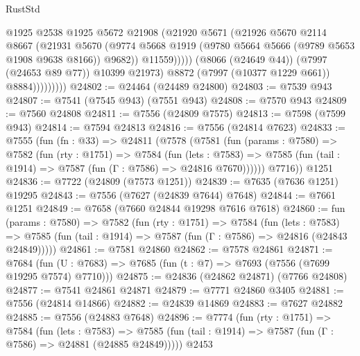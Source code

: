 \begin{lexlean}{RustStd}
\begin{coremodule}
                              @1925
                              @2538
                              @1925
                              @5672
                              @21908
                              (@21920
                                @5671
                                (@21926
                                  @5670
                                  @2114
                                  @8667
                                  (@21931
                                    @5670
                                    (@9774
                                      @5668
                                      @1919
                                      (@9780 @5664 @5666 (@9789 @5653 @1908 @9638 @8166))
                                      @9682))
                                  @11559)))))
                        (@8066 (@24649 @44))
                        (@7997 (@24653 @89 @77))
                        @10399
                        @21973)
                      @8872
                      (@7997 (@10377 @1229 @661))
                      @8884)))))))))
@24802 := @24464 (@24489 @24800)
@24803 := @7539 @943
@24807 := @7541 (@7545 @943) (@7551 @943)
@24808 := @7570 @943
@24809 := @7560 @24808
@24811 := @7556 (@24809 @7575)
@24813 := @7598 (@7599 @943)
@24814 := @7594 @24813
@24816 := @7556 (@24814 @7623)
@24833 := @7555
    (fun (fn : @33) =>
    @24811
      (@7578
        (@7581
          (fun (params : @7580) =>
          @7582
            (fun (rty : @1751) =>
            @7584
              (fun (lets : @7583) =>
              @7585 (fun (tail : @1914) => @7587 (fun (Γ : @7586) => @24816 @7670))))))
        @7716))
    @1251
@24836 := @7722 (@24809 (@7573 @1251))
@24839 := @7635 (@7636 @1251) @19295
@24843 := @7556 (@7627 (@24839 @7644) @7648)
@24844 := @7661 @1251
@24849 := @7658 (@7660 @24844 @19298 @7616 @7618)
@24860 := fun (params : @7580) =>
  @7582
    (fun (rty : @1751) =>
    @7584
      (fun (lets : @7583) =>
      @7585 (fun (tail : @1914) => @7587 (fun (Γ : @7586) => @24816 (@24843 @24849)))))
@24861 := @7581 @24860
@24862 := @7578 @24861
@24871 := @7684
    (fun (U : @7683) => @7685 (fun (t : @7) => @7693 (@7556 (@7699 @19295 @7574) @7710)))
@24875 := @24836 (@24862 @24871) (@7766 @24808)
@24877 := @7541 @24861 @24871
@24879 := @7771 @24860 @3405
@24881 := @7556 (@24814 @14866)
@24882 := @24839 @14869
@24883 := @7627 @24882
@24885 := @7556 (@24883 @7648)
@24896 := @7774
    (fun (rty : @1751) =>
    @7584
      (fun (lets : @7583) =>
      @7585 (fun (tail : @1914) => @7587 (fun (Γ : @7586) => @24881 (@24885 @24849)))))
    @2453

\end{coremodule}
\end{lexlean}
